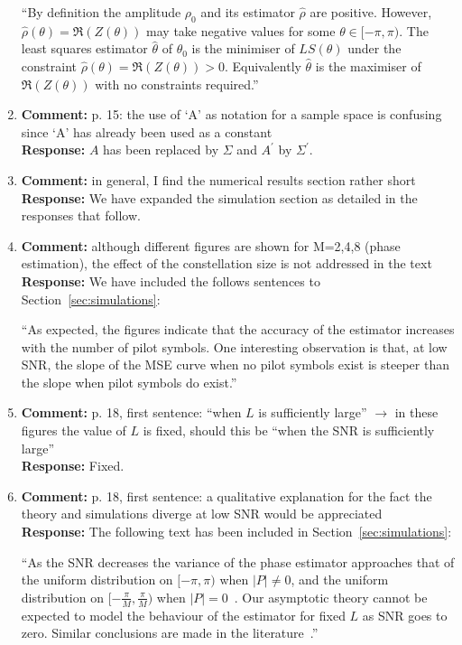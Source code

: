 \documentclass{article}
\newcommand{\abs}[1]{{\left\vert #1 \right\vert}}
\begin{document}
\begin{enumerate}
``By definition the amplitude $\rho_0$ and its estimator $\hat{\rho}$ are positive.  However, $\hat{\rho}(\theta) = \Re(Z(\theta))$ may take negative values for some $\theta \in [-\pi,\pi)$.  The least squares estimator $\hat{\theta}$ of $\theta_0$ is the minimiser of $LS(\theta)$ under the constraint $\hat{\rho}(\theta) = \Re(Z(\theta)) > 0$.  Equivalently $\hat{\theta}$ is the maximiser of $\Re(Z(\theta))$ with no constraints required.''

\item \textbf{Comment:} p. 15: the use of `A' as notation for a sample space is confusing since `A' has already been used as a constant \\
\textbf{Response:} $A$ has been replaced by $\Sigma$ and $A^\prime$ by $\Sigma^\prime$.

\item \textbf{Comment:} in general, I find the numerical results section rather short \\
\textbf{Response:} We have expanded the simulation section as detailed in the responses that follow.

\item \textbf{Comment:} although different figures are shown for M=2,4,8 (phase estimation), the effect of the constellation size is not addressed in the text  \\
\textbf{Response:}  We have included the follows sentences to Section~\ref{sec:simulations}:

``As expected, the figures indicate that the accuracy of the estimator increases with the number of pilot symbols.  One interesting observation is that, at low SNR, the slope of the MSE curve when no pilot symbols exist is steeper than the slope when pilot symbols do exist.''

\item \textbf{Comment:} p. 18, first sentence: ``when $L$ is sufficiently large'' $\to$ in these figures the value of $L$ is fixed, should this be ``when the SNR is sufficiently large''  \\
\textbf{Response:} Fixed.

\item \textbf{Comment:} p. 18, first sentence: a qualitative explanation for the fact the theory and simulations diverge at low SNR would be appreciated  \\
\textbf{Response:} The following text has been included in Section~\ref{sec:simulations}:

``As the SNR decreases the variance of the phase estimator approaches that of the uniform distribution on $[-\pi, \pi)$ when $\abs{P} \neq 0$, and the uniform distribution on $[-\tfrac{\pi}{M}, \tfrac{\pi}{M})$ when $\abs{P}=0$~\cite{McKilliam_leastsqPSKnoncoICASSP_2012}.  Our asymptotic theory cannot be expected to model the behaviour of the estimator for fixed $L$ as SNR goes to zero.  Similar conclusions are made in the literature~\cite{ViterbiViterbi_phase_est_1983,6365847}.''


\end{enumerate}
\end{document}
